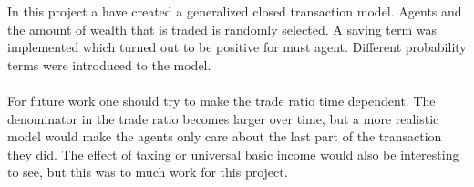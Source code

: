 In this project a have created a generalized closed transaction model. Agents and the amount of wealth that is traded is randomly selected. A saving term was implemented which turned out to be positive for must agent. Different probability terms were introduced to the model. 
\\
\\
For future work one should try to make the trade ratio time dependent. The denominator in the trade ratio becomes larger over time, but a more realistic model would make the agents only care about the last part of the transaction they did. The effect of taxing or universal basic income would also be interesting to see, but this was to much work for this project. 